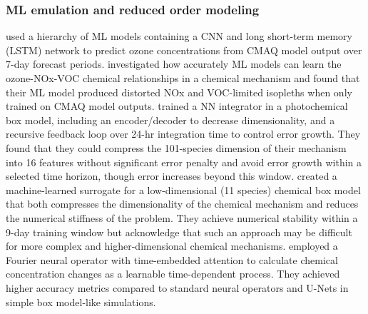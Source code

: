 \documentclass[gmd, manuscript]{copernicus}
\begin{document}
\subsubsection{ML emulation and reduced order modeling}
\citet{Xing2020} used a hierarchy of ML models containing a CNN and long short-term memory (LSTM) network to predict ozone concentrations from CMAQ model output over 7-day forecast periods. \citet{kuo_ozone_2023} investigated how accurately ML models can learn the ozone-NOx-VOC chemical relationships in a chemical mechanism and found that their ML model produced distorted NOx and VOC-limited isopleths when only trained on CMAQ model outputs. \citet{kelp_online-learned_nodate} trained a NN integrator in a photochemical box model, including an encoder/decoder to decrease dimensionality, and a recursive feedback loop over 24-hr integration time to control error growth. They found that they could compress the 101-species dimension of their mechanism into 16 features without significant error penalty and avoid error growth within a selected time horizon, though error increases beyond this window. \citet{yang_atmospheric_2024} created a machine-learned surrogate for a low-dimensional (11 species) chemical box model that both compresses the dimensionality of the chemical mechanism and reduces the numerical stiffness of the problem. They achieve numerical stability within a 9-day training window but acknowledge that such an approach may be difficult for more complex and higher-dimensional chemical mechanisms. \citet{liu_2024}  employed a Fourier neural operator with time-embedded attention to calculate chemical concentration changes as a learnable time-dependent process. They achieved higher accuracy metrics compared to standard neural operators and U-Nets in simple box model-like simulations. 
\end{document}
